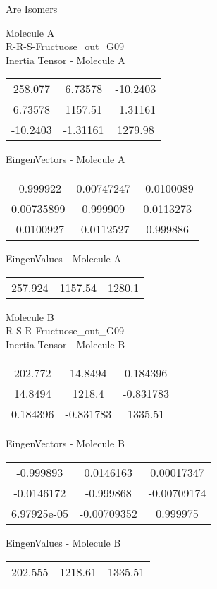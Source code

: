 \begin{center}
\vtab
\vtab
\textcolor{NavyBlue}{\Large Are Isomers}
\end{center}
\newpage
\begin{multicols}{2}
\begin{center}
Molecule A \\ 
R-R-S-Fructuose\_out\_G09
\\
Inertia Tensor - Molecule A \\
\vtab
\begin{tabular}{|c c c|}
258.077	 & 	6.73578	 & 	-10.2403	 \\
6.73578	 & 	1157.51	 & 	-1.31161	 \\
-10.2403	 & 	-1.31161	 & 	1279.98
\end{tabular}

\vtab
 EingenVectors - Molecule A     \\
\vtab
\begin{tabular}{|c c c|}
-0.999922	 & 	0.00747247	 & 	-0.0100089	 \\
0.00735899	 & 	0.999909	 & 	0.0113273	 \\
-0.0100927	 & 	-0.0112527	 & 	0.999886
\end{tabular}

\vtab
 EingenValues - Molecule A     \\
\vtab
\begin{tabular}{|c c c|}
257.924	 & 	1157.54	 & 	1280.1
\end{tabular}
\columnbreak

Molecule B \\ 
R-S-R-Fructuose\_out\_G09
\\
Inertia Tensor - Molecule B \\
\vtab
\begin{tabular}{|c c c|}
202.772	 & 	14.8494	 & 	0.184396	 \\
14.8494	 & 	1218.4	 & 	-0.831783	 \\
0.184396	 & 	-0.831783	 & 	1335.51
\end{tabular}

\vtab
 EingenVectors - Molecule B     \\
\vtab
\begin{tabular}{|c c c|}
-0.999893	 & 	0.0146163	 & 	0.00017347	 \\
-0.0146172	 & 	-0.999868	 & 	-0.00709174	 \\
6.97925e-05	 & 	-0.00709352	 & 	0.999975
\end{tabular}

\vtab
 EingenValues - Molecule B     \\
\vtab
\begin{tabular}{|c c c|}
202.555	 & 	1218.61	 & 	1335.51
\end{tabular}

\end{center}
\end{multicols}

